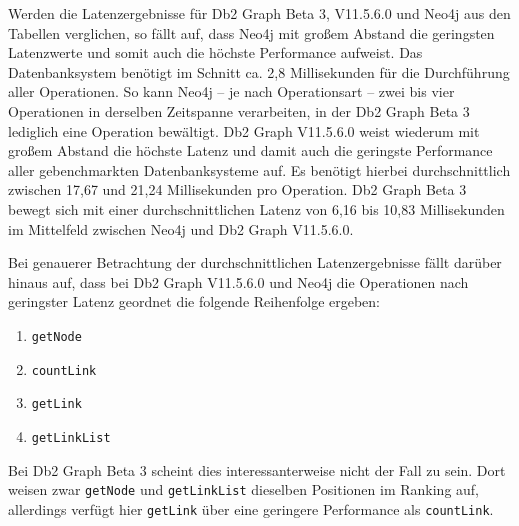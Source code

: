 \begin{table}[!ht]
\centering
{}
\caption{Latenz Linkbench-Const-10M Neo4j}
\label{tab:latenz_10m_const:neo4j}
\end{table}

Werden die Latenzergebnisse für Db2 Graph Beta 3, V11.5.6.0 und Neo4j aus den Tabellen verglichen, so fällt auf, dass Neo4j mit großem Abstand die geringsten Latenzwerte und somit auch die höchste Performance aufweist. Das Datenbanksystem benötigt im Schnitt ca. 2,8 Millisekunden für die Durchführung aller Operationen. So kann Neo4j -- je nach Operationsart -- zwei bis vier Operationen in derselben Zeitspanne verarbeiten, in der Db2 Graph Beta 3 lediglich eine Operation bewältigt. Db2 Graph V11.5.6.0 weist wiederum mit großem Abstand die höchste Latenz und damit auch die geringste Performance aller gebenchmarkten Datenbanksysteme auf. Es benötigt hierbei durchschnittlich zwischen 17,67 und 21,24 Millisekunden pro Operation. Db2 Graph Beta 3 bewegt sich mit einer durchschnittlichen Latenz von 6,16 bis 10,83 Millisekunden im Mittelfeld zwischen Neo4j und Db2 Graph V11.5.6.0.

Bei genauerer Betrachtung der durchschnittlichen Latenzergebnisse fällt darüber hinaus auf, dass bei Db2 Graph V11.5.6.0 und Neo4j die Operationen nach geringster Latenz geordnet die folgende Reihenfolge ergeben:
\begin{enumerate}
    \item \texttt{getNode}
    \item \texttt{countLink}
    \item \texttt{getLink}
    \item \texttt{getLinkList}
\end{enumerate}
Bei Db2 Graph Beta 3 scheint dies interessanterweise nicht der Fall zu sein. Dort weisen zwar \texttt{getNode} und \texttt{getLinkList} dieselben Positionen im Ranking auf, allerdings verfügt hier \texttt{getLink} über eine geringere Performance als \texttt{countLink}.

